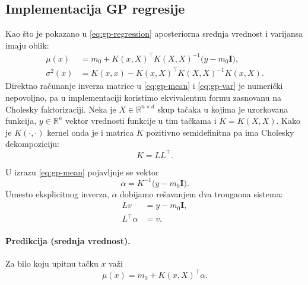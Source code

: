 ﻿\documentclass[11pt,a4paper]{article}
\begin{document}
\subsection{Implementacija GP regresije}
Kao što je pokazano u \ref{eq:gp-regression} aposteriorna srednja vrednost i varijansa imaju oblik:
\begin{align}
  \mu(x)      & = m_0 + K(x,X)^\top K(X,X)^{-1}\big(y - m_0\mathbf{I}), \label{eq:gp-mean} \\
  \sigma^2(x) & = K(x,x) - K(x,X)^\top K(X,X)^{-1}K(x,X). \label{eq:gp-var}
\end{align}
Direktno računanje inverza matrice u \eqref{eq:gp-mean} i \eqref{eq:gp-var} je numerički nepovoljno, pa u implementaciji koristimo ekvivalentnu formu zasnovanu na Cholesky faktorizaciji.
Neka je $X\in\mathbb{R}^{n\times d}$ skup tačaka u kojima je uzorkovana funkcija, $y\in\mathbb{R}^n$ vektor vrednosti funkcije u tim tačkama i $K = K(X,X)$.
Kako je $K(\cdot,\cdot)$ kernel onda je i matrica $K$ pozitivno semidefinitna pa ima Cholesky dekompoziciju:
\begin{equation*}
  K = LL^\top.
\end{equation*}

U izrazu \eqref{eq:gp-mean} pojavljuje se vektor
\begin{equation*}
  \alpha = K^{-1}\big(y - m_0\mathbf{I}).
\end{equation*}
Umesto eksplicitnog inverza, $\alpha$ dobijamo rešavanjem dva trougaona sistema:
\begin{align*}
  L v           & = y - m_0\mathbf{I}, \\
  L^\top \alpha & = v.
\end{align*}

\paragraph{Predikcija (srednja vrednost).}
Za bilo koju upitnu tačku $x$ važi
\begin{equation*}
  \mu(x) = m_0 + K(x,X)^\top \alpha.
\end{equation*}
\end{document}
